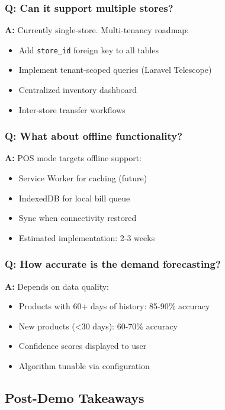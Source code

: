 \subsubsection{Q: Can it support multiple stores?}

\textbf{A:} Currently single-store. Multi-tenancy roadmap:
\begin{itemize}
    \item Add \texttt{store\_id} foreign key to all tables
    \item Implement tenant-scoped queries (Laravel Telescope)
    \item Centralized inventory dashboard
    \item Inter-store transfer workflows
\end{itemize}

\subsubsection{Q: What about offline functionality?}

\textbf{A:} POS mode targets offline support:
\begin{itemize}
    \item Service Worker for caching (future)
    \item IndexedDB for local bill queue
    \item Sync when connectivity restored
    \item Estimated implementation: 2-3 weeks
\end{itemize}

\subsubsection{Q: How accurate is the demand forecasting?}

\textbf{A:} Depends on data quality:
\begin{itemize}
    \item Products with 60+ days of history: 85-90\% accuracy
    \item New products (<30 days): 60-70\% accuracy
    \item Confidence scores displayed to user
    \item Algorithm tunable via configuration
\end{itemize}

\subsection{Post-Demo Takeaways}

